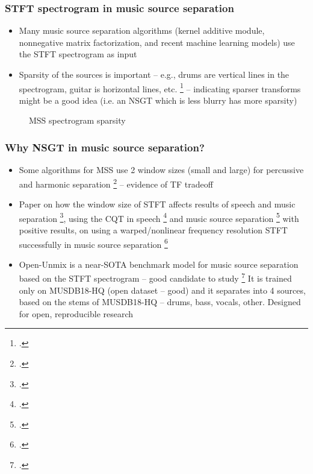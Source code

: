 \documentclass[usenames,dvipsnames]{beamer}
\begin{document}
\begin{frame}
	\frametitle{STFT spectrogram in music source separation}
	\begin{itemize}
		\item
			Many music source separation algorithms (kernel additive module, nonnegative matrix factorization, and recent machine learning models) use the STFT spectrogram as input
		\item
			Sparsity of the sources is important -- e.g., drums are vertical lines in the spectrogram, guitar is horizontal lines, etc. \footcite{musicsepgood} -- indicating sparser transforms might be a good idea (i.e. an NSGT which is less blurry has more sparsity)
	\end{itemize}
	\begin{figure}[ht]
		\vspace{-1em}
		\centering
		\caption{MSS spectrogram sparsity}
	\label{fig:sepgood}
\end{figure}

\end{frame}

\begin{frame}
	\frametitle{Why NSGT in music source separation?}
	\begin{itemize}
		\item
			Some algorithms for MSS use 2 window sizes (small and large) for percussive and harmonic separation \footcite{fitzgerald2, driedger} -- evidence of TF tradeoff
		\item
			Paper on how the window size of STFT affects results of speech and music separation \footcite{musicsepwindow}, using the CQT in speech \footcite{cqtseparation} and music source separation \footcite{fitzgerald2} with positive results, on using a warped/nonlinear frequency resolution STFT successfully in music source separation \footcite{bettermusicsep}
		\item
			 Open-Unmix is a near-SOTA benchmark model for music source separation based on the STFT spectrogram -- good candidate to study \footcite{umx} It is trained only on MUSDB18-HQ (open dataset -- good) and it separates into 4 sources, based on the stems of MUSDB18-HQ -- drums, bass, vocals, other. Designed for open, reproducible research
	\end{itemize}
\end{frame}
\end{document}

